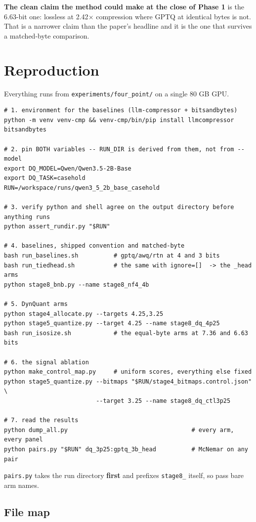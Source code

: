 \documentclass[11pt]{article}
\newcommand{\x}{\texorpdfstring{$\times$}{x}}
\newcommand{\code}[1]{\texttt{#1}}
\begin{document}
\textbf{The clean claim the method could make at the close of Phase 1} is the 6.63-bit one: lossless
at 2.42\x{} compression where GPTQ at identical bytes is not. That is a narrower claim than the
paper's headline and it is the one that survives a matched-byte comparison.

\section{Reproduction}

Everything runs from \code{experiments/four\_point/} on a single 80 GB GPU.

{\footnotesize
\begin{verbatim}
# 1. environment for the baselines (llm-compressor + bitsandbytes)
python -m venv venv-cmp && venv-cmp/bin/pip install llmcompressor bitsandbytes

# 2. pin BOTH variables -- RUN_DIR is derived from them, not from --model
export DQ_MODEL=Qwen/Qwen3.5-2B-Base
export DQ_TASK=casehold
RUN=/workspace/runs/qwen3_5_2b_base_casehold

# 3. verify python and shell agree on the output directory before anything runs
python assert_rundir.py "$RUN"

# 4. baselines, shipped convention and matched-byte
bash run_baselines.sh          # gptq/awq/rtn at 4 and 3 bits
bash run_tiedhead.sh           # the same with ignore=[]  -> the _head arms
python stage8_bnb.py --name stage8_nf4_4b

# 5. DynQuant arms
python stage4_allocate.py --targets 4.25,3.25
python stage5_quantize.py --target 4.25 --name stage8_dq_4p25
bash run_isosize.sh            # the equal-byte arms at 7.36 and 6.63 bits

# 6. the signal ablation
python make_control_map.py     # uniform scores, everything else fixed
python stage5_quantize.py --bitmaps "$RUN/stage4_bitmaps.control.json" \
                          --target 3.25 --name stage8_dq_ctl3p25

# 7. read the results
python dump_all.py                                   # every arm, every panel
python pairs.py "$RUN" dq_3p25:gptq_3b_head          # McNemar on any pair
\end{verbatim}}

\code{pairs.py} takes the run directory \textbf{first} and prefixes \code{stage8\_} itself, so pass
bare arm names.

\subsection{File map}
\end{document}
